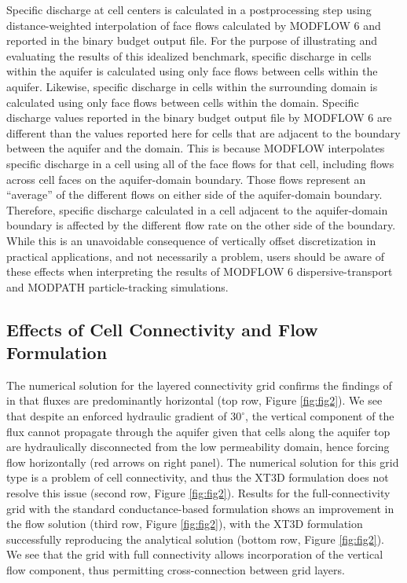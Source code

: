 \documentclass{article}
\begin{document}
Specific discharge at cell centers is calculated in a postprocessing step using distance-weighted interpolation of face flows calculated by MODFLOW 6 and reported in the binary budget output file. For the purpose of illustrating and evaluating the results of this idealized benchmark, specific discharge in cells within the aquifer is calculated using only face flows between cells within the aquifer. Likewise, specific discharge in cells within the surrounding domain is calculated using only face flows between cells within the domain. Specific discharge values reported in the binary budget output file by MODFLOW 6 are different than the values reported here for cells that are adjacent to the boundary between the aquifer and the domain. This is because MODFLOW interpolates specific discharge in a cell using all of the face flows for that cell, including flows across cell faces on the aquifer-domain boundary. Those flows represent an ``average'' of the different flows on either side of the aquifer-domain boundary. Therefore, specific discharge calculated in a cell adjacent to the aquifer-domain boundary is affected by the different flow rate on the other side of the boundary. While this is an unavoidable consequence of vertically offset discretization in practical applications, and not necessarily a problem, users should be aware of these effects when interpreting the results of MODFLOW 6 dispersive-transport and MODPATH particle-tracking simulations.

\subsection{Effects of Cell Connectivity and Flow Formulation}

The numerical solution for the layered connectivity grid confirms the findings of \cite{bardot2022} in that fluxes are predominantly horizontal (top row, Figure \ref{fig:fig2}). We see that despite an enforced hydraulic gradient of $30^{\circ}$, the vertical component of the flux cannot propagate through the aquifer given that cells along the aquifer top are hydraulically disconnected from the low permeability domain, hence forcing flow horizontally (red arrows on right panel). The numerical solution for this grid type is a problem of cell connectivity, and thus the XT3D formulation does not resolve this issue (second row, Figure \ref{fig:fig2}). Results for the full-connectivity grid with the standard conductance-based formulation shows an improvement in the flow solution (third row, Figure \ref{fig:fig2}), with the XT3D formulation successfully reproducing the analytical solution (bottom row, Figure \ref{fig:fig2}). We see that the grid with full connectivity allows incorporation of the vertical flow component, thus permitting cross-connection between grid layers.
\end{document}
